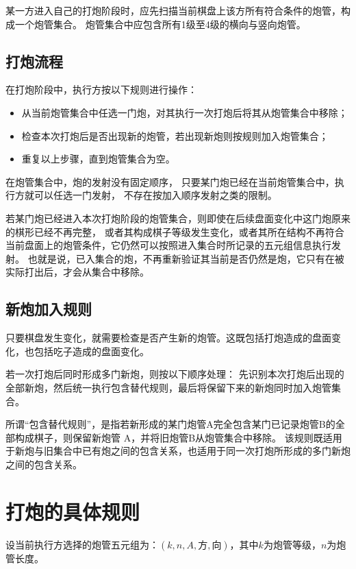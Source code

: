 \documentclass[12pt]{ctexart}
\begin{document}
某一方进入自己的打炮阶段时，应先扫描当前棋盘上该方所有符合条件的炮管，构成一个炮管集合。
炮管集合中应包含所有1级至4级的横向与竖向炮管。

\subsection{打炮流程}

在打炮阶段中，执行方按以下规则进行操作：

\begin{itemize}
\item 从当前炮管集合中任选一门炮，对其执行一次打炮后将其从炮管集合中移除；
\item 检查本次打炮后是否出现新的炮管，若出现新炮则按规则加入炮管集合；
\item 重复以上步骤，直到炮管集合为空。
\end{itemize}

在炮管集合中，炮的发射没有固定顺序，
只要某门炮已经在当前炮管集合中，执行方就可以任选一门发射，
不存在按加入顺序发射之类的限制。

若某门炮已经进入本次打炮阶段的炮管集合，则即使在后续盘面变化中这门炮原来的棋形已经不再完整，
或者其构成棋子等级发生变化，或者其所在结构不再符合当前盘面上的炮管条件，它仍然可以按照进入集合时所记录的五元组信息执行发射。
也就是说，已入集合的炮，不再重新验证其当前是否仍然是炮，它只有在被实际打出后，才会从集合中移除。

\subsection{新炮加入规则}

只要棋盘发生变化，就需要检查是否产生新的炮管。这既包括打炮造成的盘面变化，也包括吃子造成的盘面变化。

若一次打炮后同时形成多门新炮，则按以下顺序处理：
先识别本次打炮后出现的全部新炮，然后统一执行包含替代规则，最后将保留下来的新炮同时加入炮管集合。

所谓“包含替代规则”，是指若新形成的某门炮管A完全包含某门已记录炮管B的全部构成棋子，则保留新炮管 A，并将旧炮管B从炮管集合中移除。
该规则既适用于新炮与旧集合中已有炮之间的包含关系，也适用于同一次打炮所形成的多门新炮之间的包含关系。

\section{打炮的具体规则}

设当前执行方选择的炮管五元组为：$(k,n,A,\text{方},\text{向})$，其中$k$为炮管等级，$n$为炮管长度。
\end{document}
